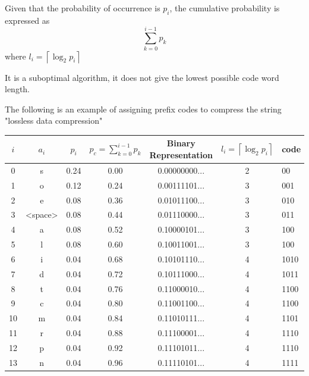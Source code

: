 \documentclass{article}
\begin{document}
Given that the probability of occurrence is $p_{i}$, the cumulative probability is expressed as 
$$\sum_{k=0}^{i-1} p_{k}$$ where $l_{i} = \left \lceil \log_{2} p_{i} \right \rceil$ 

It is a suboptimal algorithm, it does not give the lowest possible code word length.

The following is an example of assigning prefix codes to compress the string "lossless data compression"


\begin{center}
	\begin{tabular}{ccccccl}
		\toprule
		$i$ & $a_{i}$ &     $p_{i}$ &  $p_{c} = \sum\limits_{k=0}^{i-1} p_{k}$ &    Binary Representation &  $l_{i} = \left \lceil \log_{2} p_{i} \right \rceil$ &  code \\
		\midrule
		0  &        s &  0.24 &          0.00 &  0.00000000... &               2 &    00 \\
		1  &        o &  0.12 &          0.24 &  0.00111101... &               3 &   001 \\
		2  &        e &  0.08 &          0.36 &  0.01011100... &               3 &   010 \\
		3  &   <space>  &  0.08 &          0.44 &  0.01110000... &               3 &   011 \\
		4  &        a &  0.08 &          0.52 &  0.10000101... &               3 &   100 \\
		5  &        l &  0.08 &          0.60 &  0.10011001... &               3 &   100 \\
		6  &        i &  0.04 &          0.68 &  0.10101110... &               4 &  1010 \\
		7  &        d &  0.04 &          0.72 &  0.10111000... &               4 &  1011 \\
		8  &        t &  0.04 &          0.76 &  0.11000010... &               4 &  1100 \\
		9  &        c &  0.04 &          0.80 &  0.11001100... &               4 &  1100 \\
		10 &        m &  0.04 &          0.84 &  0.11010111... &               4 &  1101 \\
		11 &        r &  0.04 &          0.88 &  0.11100001... &               4 &  1110 \\
		12 &        p &  0.04 &          0.92 &  0.11101011... &               4 &  1110 \\
		13 &        n &  0.04 &          0.96 &  0.11110101... &               4 &  1111 \\
		\bottomrule
	\end{tabular}
\end{center}
\end{document}
